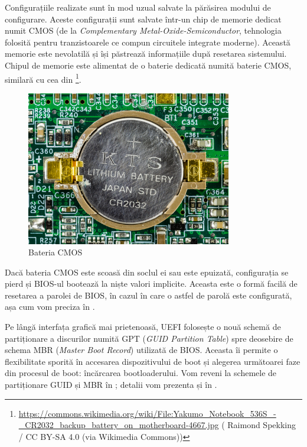 Configurațiile realizate sunt în mod uzual salvate la părăsirea modului de
configurare. Aceste configurații sunt salvate într-un chip de memorie dedicat
numit CMOS  (de la
\textit{Complementary Metal-Oxide-Semiconductor}, tehnologia folosită pentru
tranzistoarele ce compun circuitele integrate moderne). Această memorie este
nevolatilă și își păstrează informațiile după resetarea sistemului. Chipul de
memorie este alimentat de o baterie dedicată numită baterie CMOS, similară cu
cea din \footnote{\url{https://commons.wikimedia.org/wiki/File:Yakumo\_Notebook\_536S\_-\_CR2032\_backup\_battery\_on\_motherboard-4667.jpg} (\textcopyright{} Raimond Spekking / CC BY-SA 4.0 (via Wikimedia Commons))}.

\begin{figure}[!htbp]
  \centering
  \includegraphics[width=0.8\textwidth]{chapters/09-boot/img/cmos-battery.jpg}
  \caption{Bateria CMOS}
  \label{fig:boot:cmos-battery}
\end{figure}

Dacă bateria CMOS este scoasă din soclul ei sau este epuizată, configurația se
pierd și BIOS-ul bootează la niște valori implicite. Aceasta este o formă facilă
de resetarea a parolei de BIOS, în cazul în care o astfel de parolă este
configurată, așa cum vom preciza în .

Pe lângă interfața grafică mai prietenoasă, UEFI folosește o nouă schemă de
partiționare a discurilor numită GPT  (\textit{GUID
Partition Table}) spre deosebire de schema MBR 
(\textit{Master Boot Record}) utilizată de BIOS. Aceasta îi permite o flexibilitate
sporită în accesarea dispozitivului de boot și alegerea următoarei faze din
procesul de boot: încărcarea bootloaderului. Vom reveni la schemele de partiționare GUID și MBR în ; detalii vom prezenta și în .


